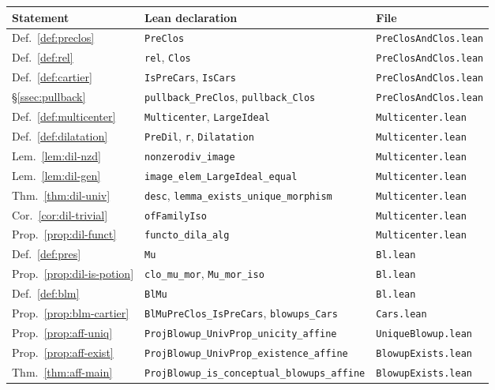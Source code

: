 \documentclass[pdflatex,sn-mathphys-num]{sn-jnl}
\theoremstyle{plain}
\theoremstyle{definition}
\begin{document}
\begin{center}
\renewcommand{\arraystretch}{1.25}
\begin{tabular}{@{}lll@{}}
\hline
Statement & Lean declaration & File \\
\hline
Def.\ \ref{def:preclos} & \texttt{PreClos} & \texttt{PreClosAndClos.lean} \\
Def.\ \ref{def:rel} & \texttt{rel}, \texttt{Clos} & \texttt{PreClosAndClos.lean} \\
Def.\ \ref{def:cartier} & \texttt{IsPreCars}, \texttt{IsCars} & \texttt{PreClosAndClos.lean} \\
\S\ref{ssec:pullback} & \texttt{pullback\_PreClos}, \texttt{pullback\_Clos} & \texttt{PreClosAndClos.lean} \\
Def.\ \ref{def:multicenter} & \texttt{Multicenter}, \texttt{LargeIdeal} & \texttt{Multicenter.lean} \\
Def.\ \ref{def:dilatation} & \texttt{PreDil}, \texttt{r}, \texttt{Dilatation} & \texttt{Multicenter.lean} \\
Lem.\ \ref{lem:dil-nzd} & \texttt{nonzerodiv\_image} & \texttt{Multicenter.lean} \\
Lem.\ \ref{lem:dil-gen} & \texttt{image\_elem\_LargeIdeal\_equal} & \texttt{Multicenter.lean} \\
Thm.\ \ref{thm:dil-univ} & \texttt{desc}, \texttt{lemma\_exists\_unique\_morphism} & \texttt{Multicenter.lean} \\
Cor.\ \ref{cor:dil-trivial} & \texttt{ofFamilyIso} & \texttt{Multicenter.lean} \\
Prop.\ \ref{prop:dil-funct} & \texttt{functo\_dila\_alg} & \texttt{Multicenter.lean} \\
Def.\ \ref{def:pres} & \texttt{Mu} & \texttt{Bl.lean} \\
Prop.\ \ref{prop:dil-is-potion} & \texttt{clo\_mu\_mor}, \texttt{Mu\_mor\_iso} & \texttt{Bl.lean} \\
Def.\ \ref{def:blm} & \texttt{BlMu} & \texttt{Bl.lean} \\
Prop.\ \ref{prop:blm-cartier} & \texttt{BlMuPreClos\_IsPreCars}, \texttt{blowups\_Cars} & \texttt{Cars.lean} \\
Prop.\ \ref{prop:aff-uniq} & \texttt{ProjBlowup\_UnivProp\_unicity\_affine} & \texttt{UniqueBlowup.lean} \\
Prop.\ \ref{prop:aff-exist} & \texttt{ProjBlowup\_UnivProp\_existence\_affine} & \texttt{BlowupExists.lean} \\
Thm.\ \ref{thm:aff-main} & \texttt{ProjBlowup\_is\_conceptual\_blowups\_affine} & \texttt{BlowupExists.lean} \\

\end{tabular}
\end{center}
\end{document}
